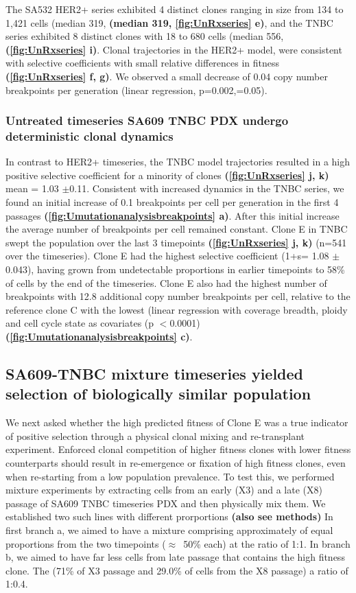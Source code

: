  The SA532 HER2+ series exhibited 4 distinct clones ranging in size from 134 to 1,421 cells (median 319, \textbf{(median 319, \autoref{fig:UnRxseries} e)}, and the TNBC series exhibited 8 distinct clones with 18 to 680 cells (median 556, \textbf{(\autoref{fig:UnRxseries} i)}. Clonal trajectories in the HER2+ model, were consistent with selective coefficients with small relative differences in fitness \textbf{(\autoref{fig:UnRxseries} f, g)}.
 We observed a small decrease of 0.04 copy number breakpoints per generation (linear regression, p=0.002,=0.05). 

\subsubsection{Untreated timeseries SA609 TNBC PDX undergo deterministic clonal dynamics}
In contrast to HER2+ timeseries, the TNBC model trajectories resulted in a high positive selective coefficient for a minority of clones \textbf{(\autoref{fig:UnRxseries} j, k)} mean = 1.03 $\pm $0.11. Consistent with increased dynamics in the TNBC series, we found an initial increase of 0.1 breakpoints per cell per generation in the first 4 passages \textbf{(\autoref{fig:Umutationanalysisbreakpoints} a)}. After this initial increase the average number of breakpoints per cell remained constant.
 Clone E in TNBC swept the population over the last 3 timepoints \textbf{(\autoref{fig:UnRxseries} j, k)} (n=541 over the timeseries). Clone E had the highest selective coefficient (1+s= 1.08 $\pm $ 0.043), having grown from undetectable proportions in earlier timepoints to 58\% of cells by the end of the timeseries. Clone E also had the highest number of breakpoints with 12.8 additional copy number breakpoints per cell, relative to the reference clone C with the lowest (linear regression with coverage breadth, ploidy and cell cycle state as covariates (p $<$0.0001) \textbf{(\autoref{fig:Umutationanalysisbreakpoints} c)}.


\subsection{SA609-TNBC mixture timeseries yielded selection of biologically similar population}
We next asked whether the high predicted fitness of Clone E was a true indicator of positive selection through a physical clonal mixing and re-transplant experiment. Enforced clonal competition of higher fitness clones with lower fitness counterparts should result in re-emergence or fixation of high fitness clones, even when re-starting from a low population prevalence. To test this, we performed mixture experiments by extracting cells from an early (X3) and a late (X8) passage of SA609 TNBC timeseries PDX
and then physically mix them. We established two such lines with different prorportions \textbf{(also see methods)}
In first branch a, we aimed to have a mixture comprising approximately of equal proportions from the two
timepoints ($\approx$~50\% each) at the ratio of 1:1. In branch b, we aimed to have far less cells from late passage that contains the high fitness clone. The (71\% of X3 passage and 29.0\% of cells from the X8 passage) a ratio of 1:0.4.


